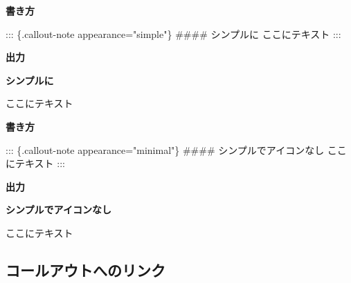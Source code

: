 \documentclass[
  b5paper,
  xelatex, ja=standard]{bxjsbook}
\newenvironment{Shaded}{\begin{snugshade}}{\end{snugshade}}
\newcommand{\FunctionTok}[1]{\textcolor[rgb]{0.28,0.35,0.67}{#1}}
\newcommand{\NormalTok}[1]{\textcolor[rgb]{0.00,0.23,0.31}{#1}}
\begin{document}
\textbf{書き方}

\begin{Shaded}
\begin{Highlighting}[]
\NormalTok{::: \{.callout{-}note appearance="simple"\}}
\FunctionTok{\#\#\#\# シンプルに}
\NormalTok{ここにテキスト}
\NormalTok{:::}
\end{Highlighting}
\end{Shaded}

\textbf{出力}

\begin{tcolorbox}[enhanced jigsaw, colback=white, colframe=quarto-callout-note-color-frame, bottomrule=.15mm, left=2mm, leftrule=.75mm, arc=.35mm, breakable, toprule=.15mm, opacityback=0, rightrule=.15mm]
\begin{minipage}[t]{5.5mm}
\textcolor{quarto-callout-note-color}{\faInfo}
\end{minipage}%
\begin{minipage}[t]{\textwidth - 5.5mm}

\vspace{-3mm}\textbf{シンプルに}\vspace{3mm}

ここにテキスト

\end{minipage}%
\end{tcolorbox}

\textbf{書き方}

\begin{Shaded}
\begin{Highlighting}[]
\NormalTok{::: \{.callout{-}note appearance="minimal"\}}
\FunctionTok{\#\#\#\# シンプルでアイコンなし}
\NormalTok{ここにテキスト}
\NormalTok{:::}
\end{Highlighting}
\end{Shaded}

\textbf{出力}

\begin{tcolorbox}[enhanced jigsaw, colback=white, colframe=quarto-callout-note-color-frame, bottomrule=.15mm, left=2mm, leftrule=.75mm, arc=.35mm, breakable, toprule=.15mm, opacityback=0, rightrule=.15mm]

\vspace{-3mm}\textbf{シンプルでアイコンなし}\vspace{3mm}

ここにテキスト

\end{tcolorbox}

\subsection{コールアウトへのリンク}\label{ux30b3ux30fcux30ebux30a2ux30a6ux30c8ux3078ux306eux30eaux30f3ux30af}
\end{document}
